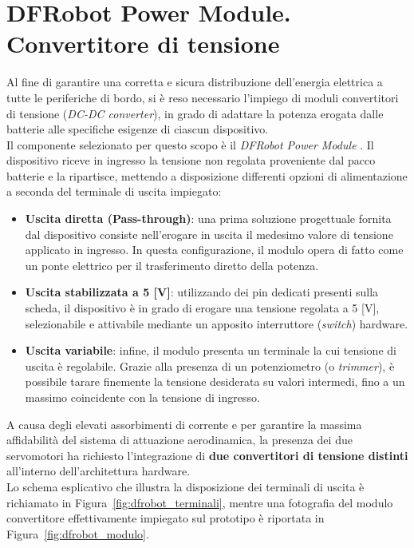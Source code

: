 \documentclass[11pt]{report}
\begin{document}
	\section{DFRobot Power Module. Convertitore di tensione}
	Al fine di garantire una corretta e sicura distribuzione dell'energia elettrica a tutte le periferiche di bordo, si è reso necessario l'impiego di moduli convertitori di tensione (\textit{DC-DC converter}), in grado di adattare la potenza erogata dalle batterie alle specifiche esigenze di ciascun dispositivo.\\
	Il componente selezionato per questo scopo è il \textit{DFRobot Power Module} \cite{dfrobot_pm}. Il dispositivo riceve in ingresso la tensione non regolata proveniente dal pacco batterie e la ripartisce, mettendo a disposizione differenti opzioni di alimentazione a seconda del terminale di uscita impiegato:
	\begin{itemize}
		\item \textbf{Uscita diretta (Pass-through)}: una prima soluzione progettuale fornita dal dispositivo consiste nell'erogare in uscita il medesimo valore di tensione applicato in ingresso. In questa configurazione, il modulo opera di fatto come un ponte elettrico per il trasferimento diretto della potenza.
		\item \textbf{Uscita stabilizzata a 5 [V]}: utilizzando dei pin dedicati presenti sulla scheda, il dispositivo è in grado di erogare una tensione regolata a 5 [V], selezionabile e attivabile mediante un apposito interruttore (\textit{switch}) hardware.
		\item \textbf{Uscita variabile}: infine, il modulo presenta un terminale la cui tensione di uscita è regolabile. Grazie alla presenza di un potenziometro (o \textit{trimmer}), è possibile tarare finemente la tensione desiderata su valori intermedi, fino a un massimo coincidente con la tensione di ingresso.
	\end{itemize}
	A causa degli elevati assorbimenti di corrente e per garantire la massima affidabilità del sistema di attuazione aerodinamica, la presenza dei due servomotori ha richiesto l'integrazione di \textbf{due convertitori di tensione distinti} all'interno dell'architettura hardware.\\
	Lo schema esplicativo che illustra la disposizione dei terminali di uscita è richiamato in Figura~\ref{fig:dfrobot_terminali}, mentre una fotografia del modulo convertitore effettivamente impiegato sul prototipo è riportata in Figura~\ref{fig:dfrobot_modulo}.
	
\end{document}
